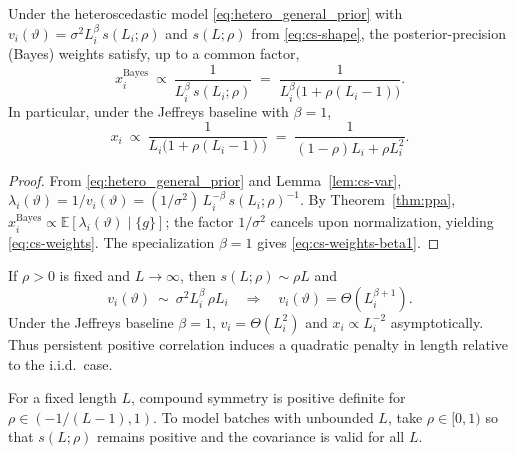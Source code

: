 \begin{proposition}\label{prop:cs-weights}
Under the heteroscedastic model \eqref{eq:hetero_general_prior} with
\(
v_i(\vartheta)=\sigma^2 L_i^{\beta}\,s(L_i;\rho)
\)
and $s(L;\rho)$ from \eqref{eq:cs-shape}, the posterior-precision (Bayes) weights satisfy, up to a common factor,
\begin{equation}
  x_i^{\mathrm{Bayes}}
  \ \propto\
  \frac{1}{L_i^{\beta}\,s(L_i;\rho)}
  \;=\;
  \frac{1}{L_i^{\beta}\big(1+\rho(L_i-1)\big)}.
  \label{eq:cs-weights}
\end{equation}
In particular, under the Jeffreys baseline with $\beta=1$,
\begin{equation}
  x_i \ \propto\ \frac{1}{L_i\big(1+\rho(L_i-1)\big)}
  \;=\; \frac{1}{(1-\rho)L_i + \rho L_i^2}.
  \label{eq:cs-weights-beta1}
\end{equation}
\end{proposition}

\begin{proof}
From \eqref{eq:hetero_general_prior} and Lemma~\ref{lem:cs-var},
\(
\lambda_i(\vartheta)=1/v_i(\vartheta)=(1/\sigma^2)\,L_i^{-\beta}\,s(L_i;\rho)^{-1}.
\)
By Theorem~\ref{thm:ppa}, $x_i^{\mathrm{Bayes}}\propto \mathbb{E}[\lambda_i(\vartheta)\mid\{g\}]$; the factor $1/\sigma^2$ cancels upon normalization, yielding \eqref{eq:cs-weights}. The specialization $\beta=1$ gives \eqref{eq:cs-weights-beta1}.
\end{proof}

\begin{corollary}\label{cor:cs-asymp}
If $\rho>0$ is fixed and $L\to\infty$, then $s(L;\rho)\sim \rho L$ and
\[
v_i(\vartheta)\ \sim\ \sigma^2 L_i^{\beta}\,\rho L_i
\quad\Longrightarrow\quad
v_i(\vartheta)=\Theta(L_i^{\beta+1}).
\]
Under the Jeffreys baseline $\beta=1$, $v_i=\Theta(L_i^2)$ and $x_i\propto L_i^{-2}$ asymptotically. Thus persistent positive correlation induces a quadratic penalty in length relative to the i.i.d.\ case.
\end{corollary}

\begin{remark}
For a fixed length $L$, compound symmetry is positive definite for $\rho\in(-1/(L-1),1)$. To model batches with unbounded $L$, take $\rho\in[0,1)$ so that $s(L;\rho)$ remains positive and the covariance is valid for all $L$.
\end{remark}


